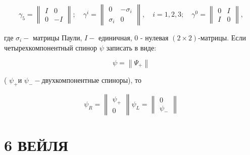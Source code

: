 \documentclass[10pt]{article}
\begin{document}
\[

\gamma_{5}=\left\|\begin{array}{cc}

I & 0 \\

0 & -I

\end{array}\right\| ; \quad \gamma^{i}=\left\|\begin{array}{cc}

0 & -\sigma_{i} \\

\sigma_{i} & 0

\end{array}\right\|, \quad i=1,2,3 ; \quad \gamma^{0}=\left\|\begin{array}{ll}

0 & I \\

I & 0

\end{array}\right\|,

\]



где $\sigma_{i}-$ матрицы Паули, $I-$ единичная, 0 - нулевая $(2 \times 2)$-матрицы. Если четырехкомпонентный спинор $\psi$ записать в виде:



\[

\psi=\left\|\Psi_{+}\right\|

\]



( $\psi_{+}$и $\psi_{-}-$двухкомпонентные спиноры), то



\[

\psi_{R}=\left\|\begin{array}{c}

\psi_{+} \\

0

\end{array}\right\| \psi_{L}=\left\|\begin{array}{c}

0 \\

\psi_{-}

\end{array}\right\|

\]



\section{6 ВЕЙЛЯ}
\end{document}
